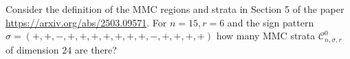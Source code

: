 Consider the definition of the MMC regions and strata in Section 5 of the paper \url{https://arxiv.org/abs/2503.09571}. For $n=15, r=6$ and the sign pattern $\sigma=(+,+,-,+,+,+,+,+,+,+,-,+,+,+,+)$ how many MMC strata $\mathcal{C}_{n,\sigma,r}^0$ of dimension $24$ are there?
